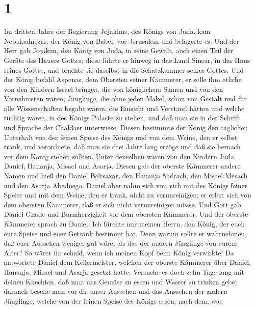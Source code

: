 \hypertarget{section}{%
\section{1}\label{section}}

 Im dritten Jahre der Regierung Jojakims, des Königs von
Juda, kam Nebukadnezar, der König von Babel, vor Jerusalem und belagerte
es.  Und der Herr gab Jojakim, den König von Juda, in
seine Gewalt, auch einen Teil der Geräte des Hauses Gottes; diese führte
er hinweg in das Land Sinear, in das Haus seines Gottes, und brachte sie
daselbst in die Schatzkammer seines Gottes.  Und der König
befahl Aspenas, dem Obersten seiner Kämmerer, er solle ihm etliche von
den Kindern Israel bringen, die von königlichem Samen und von den
Vornehmsten wären,  Jünglinge, die ohne jeden Makel, schön
von Gestalt und für alle Wissenschaften begabt wären, die Einsicht und
Verstand hätten und welche tüchtig wären, in des Königs Palaste zu
stehen, und daß man sie in der Schrift und Sprache der Chaldäer
unterwiese.  Diesen bestimmte der König den täglichen
Unterhalt von der feinen Speise des Königs und von dem Weine, den er
selbst trank, und verordnete, daß man sie drei Jahre lang erzöge und daß
sie hernach vor dem König stehen sollten.  Unter denselben
waren von den Kindern Juda Daniel, Hananja, Misael und Asarja.
 Diesen gab der oberste Kämmerer andere Namen und hieß den
Daniel Beltsazar, den Hananja Sadrach, den Misael Mesach und den Asarja
Abednego.  Daniel aber nahm sich vor, sich mit des Königs
feiner Speise und mit dem Weine, den er trank, nicht zu verunreinigen;
er erbat sich von dem obersten Kämmerer, daß er sich nicht verunreinigen
müsse.  Und Gott gab Daniel Gnade und Barmherzigkeit vor
dem obersten Kämmerer.  Und der oberste Kämmerer sprach
zu Daniel: Ich fürchte nur meinen Herrn, den König, der euch eure Speise
und euer Getränk bestimmt hat. Denn warum sollte er wahrnehmen, daß euer
Aussehen weniger gut wäre, als das der andern Jünglinge von eurem Alter?
So wäret ihr schuld, wenn ich meinen Kopf beim König verwirkte!
 Da antwortete Daniel dem Kellermeister, welchen der
oberste Kämmerer über Daniel, Hananja, Misael und Asarja gesetzt hatte:
 Versuche es doch zehn Tage lang mit deinen Knechten, daß
man uns Gemüse zu essen und Wasser zu trinken gebe; 
darnach besehe man vor dir unser Aussehen und das Aussehen der andern
Jünglinge, welche von der feinen Speise des Königs essen; nach dem, was
